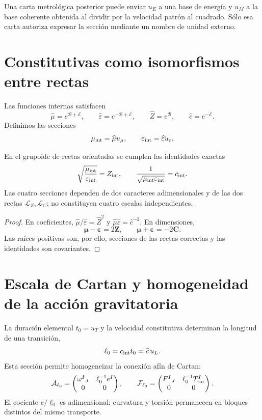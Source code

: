 Una carta metrológica posterior puede enviar \(u_E\) a una base de energía y
\(u_M\) a la base coherente obtenida al dividir por la velocidad patrón al
cuadrado. Sólo esa carta autoriza expresar la sección mediante un nombre de
unidad externo.

\section{Constitutivas como isomorfismos entre rectas}

Las funciones internas satisfacen
\[
 \widehat\mu=e^{\mathcal B+\mathcal E},
 \qquad
 \widehat\varepsilon=e^{-\mathcal B+\mathcal E},
 \qquad
 \widehat Z=e^{\mathcal B},
 \qquad
 \widehat c=e^{-\mathcal E}.
\]
Definimos las secciones
\[
 \mu_{\rm int}=\widehat\mu u_\mu,
 \qquad
 \varepsilon_{\rm int}=\widehat\varepsilon u_\varepsilon.
\]

\begin{theorem}
En el grupoide de rectas orientadas se cumplen las identidades exactas
\[
 \sqrt{\frac{\mu_{\rm int}}{\varepsilon_{\rm int}}}
 =Z_{\rm int},
 \qquad
 \frac1{\sqrt{\mu_{\rm int}\varepsilon_{\rm int}}}
 =c_{\rm int}.
\]
Las cuatro secciones dependen de dos caracteres adimensionales y de las dos
rectas \(\mathcal L_Z,\mathcal L_C\); no constituyen cuatro escalas
independientes.
\end{theorem}

\begin{proof}
En coeficientes,
\(\widehat\mu/\widehat\varepsilon=\widehat Z^2\) y
\(\widehat\mu\widehat\varepsilon=\widehat c^{-2}\). En dimensiones,
\[
 \boldsymbol\mu-\boldsymbol\varepsilon=2\mathbf Z,
 \qquad
 \boldsymbol\mu+\boldsymbol\varepsilon=-2\mathbf C.
\]
Las raíces positivas son, por ello, secciones de las rectas correctas y las
identidades son covariantes.
\end{proof}

\section{Escala de Cartan y homogeneidad de la acción gravitatoria}

La duración elemental \(t_0=u_T\) y la velocidad constitutiva determinan la
longitud de una transición,
\[
 \ell_0=c_{\rm int}t_0=\widehat c\,u_L.
\]
Esta sección permite homogeneizar la conexión afín de Cartan:
\[
 \mathcal A_{\ell_0}
 =\begin{pmatrix}
 \omega^I{}_J&\ell_0^{-1}e^I\\
 0&0
 \end{pmatrix},
 \qquad
 \mathcal F_{\ell_0}
 =\begin{pmatrix}
 F^I{}_J&\ell_0^{-1}T_{\rm tor}^I\\
 0&0
 \end{pmatrix}.
\]
El cociente \(e/\ell_0\) es adimensional; curvatura y torsión permanecen en
bloques distintos del mismo transporte.

